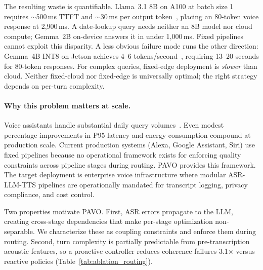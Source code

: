 \documentclass{article}
\begin{document}
The resulting waste is quantifiable. Llama~3.1 8B on A100 at batch size 1 requires $\sim$500\,ms TTFT and $\sim$30\,ms per output token~\citep{mlperf2025}, placing an 80-token voice response at 2{,}900\,ms. A date-lookup query needs neither an 8B model nor cloud compute; Gemma~2B on-device answers it in under 1{,}000\,ms. Fixed pipelines cannot exploit this disparity. A less obvious failure mode runs the other direction: Gemma~4B INT8 on Jetson achieves 4--6 tokens/second~\citep{song2023powerinfer}, requiring 13--20 seconds for 80-token responses. For complex queries, fixed-edge deployment is \emph{slower} than cloud. Neither fixed-cloud nor fixed-edge is universally optimal; the right strategy depends on per-turn complexity.

\paragraph{Why this problem matters at scale.} Voice assistants handle substantial daily query volumes~\citep{openai2024gpt4o}. Even modest percentage improvements in P95 latency and energy consumption compound at production scale. Current production systems (Alexa, Google Assistant, Siri) use fixed pipelines because no operational framework exists for enforcing quality constraints across pipeline stages during routing. PAVO provides this framework. The target deployment is enterprise voice infrastructure where modular ASR-LLM-TTS pipelines are operationally mandated for transcript logging, privacy compliance, and cost control.

Two properties motivate PAVO. First, ASR errors propagate to the LLM, creating cross-stage dependencies that make per-stage optimization non-separable. We characterize these as coupling constraints and enforce them during routing. Second, turn complexity is partially predictable from pre-transcription acoustic features, so a proactive controller reduces coherence failures 3.1$\times$ versus reactive policies (Table~\ref{tab:ablation_routing}).
\end{document}
